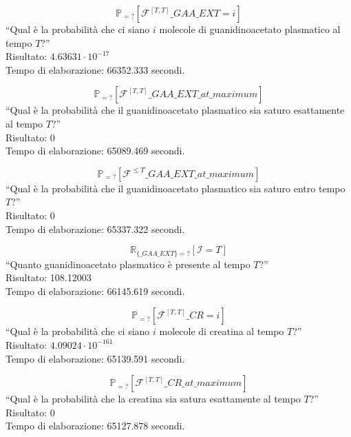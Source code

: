 \begin{equation}
	\mathbb{P}_{=?} [ \mathcal{F}^{[T,T]} \_GAA\_EXT=i ]
\end{equation}
``Qual \`e la probabilit\`a che ci siano $i$ molecole di guanidinoacetato plasmatico al tempo $T$?''\\
Risultato: $4.63631 \cdot 10^{-17}$\\
Tempo di elaborazione: 66352.333 secondi.

\begin{equation}
	\mathbb{P}_{=?} [ \mathcal{F}^{[T,T]} \_GAA\_EXT\_at\_maximum ]
\end{equation}
``Qual \`e la probabilit\`a che il guanidinoacetato plasmatico sia saturo esattamente al tempo $T$?''\\
Risultato: 0\\
Tempo di elaborazione: 65089.469 secondi.

\begin{equation}
	\mathbb{P}_{=?} [ \mathcal{F}^{\leq T} \_GAA\_EXT\_at\_maximum ]
\end{equation}
``Qual \`e la probabilit\`a che il guanidinoacetato plasmatico sia saturo entro tempo $T$?''\\
Risultato: 0\\
Tempo di elaborazione: 65337.322 secondi.

\begin{equation}
	\mathbb{R}_{\{\_GAA\_EXT\}=?} [ \mathcal{I}=T ]
\end{equation}
``Quanto guanidinoacetato plasmatico \`e presente al tempo $T$?''\\
Risultato: 108.12003\\
Tempo di elaborazione: 66145.619 secondi.

\begin{equation}
	\mathbb{P}_{=?} [ \mathcal{F}^{[T,T]} \_CR=i ]
\end{equation}
``Qual \`e la probabilit\`a che ci siano $i$ molecole di creatina al tempo $T$?''\\
Risultato: $4.09024 \cdot 10^{-161}$\\
Tempo di elaborazione: 65139.591 secondi.

\begin{equation}
	\mathbb{P}_{=?} [ \mathcal{F}^{[T,T]} \_CR\_at\_maximum ]
\end{equation}
``Qual \`e la probabilit\`a che la creatina sia satura esattamente al tempo $T$?''\\
Risultato: 0\\
Tempo di elaborazione: 65127.878 secondi.

